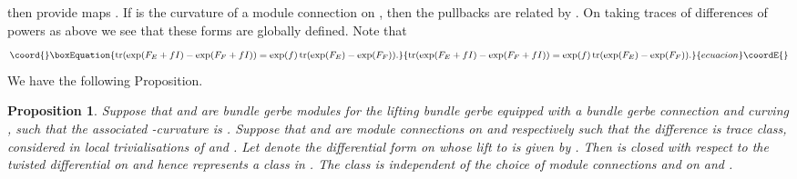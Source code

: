 \documentclass[a4paper,reqno]{amsart}
\DeclareMathOperator{\tr}{tr}
\theoremstyle{plain}
\newtheorem{proposition}[theorem]{Proposition}
\theoremstyle{definition}
\theoremstyle{remark}
\numberwithin{equation}{section}
\numberwithin{figure}{section}
\providecommand{\<}{\langle}
\renewcommand{\>}{\rangle}
\begin{document}
then provide maps \coordHE{}.  If \coordHE{} is the curvature of a module 
connection on \coordHE{}, then the pullbacks \coordHE{} are related by \coordHE{}.  On taking traces 
of differences of powers as above we see that these forms 
are globally defined.    
Note that 
\begin{equation}\coord{}\boxEquation{ 
\label{eq:character form} 
\tr(\exp(F_E + fI) - \exp(F_F + fI)) 
= \exp(f)\tr(\exp(F_E) - \exp(F_F)). 
}{ 
\tr(\exp(F_E + fI) - \exp(F_F + fI)) 
= \exp(f)\tr(\exp(F_E) - \exp(F_F)). 
}{ecuacion}\coordE{}\end{equation} 
We have the following Proposition. 
\begin{proposition} 
Suppose that \coordHE{} and \coordHE{} are \coordHE{} bundle gerbe modules for 
the lifting bundle gerbe \coordHE{} equipped with a 
bundle gerbe connection \coordHE{} and curving \coordHE{}, such 
that the associated \coordHE{}-curvature is \coordHE{}.  
Suppose that \coordHE{} and \coordHE{} are module 
connections on \coordHE{} and \coordHE{} respectively 
such that the difference \coordHE{} is trace class, 
considered in local trivialisations of \coordHE{} and \coordHE{}.    
Let \coordHE{} denote the differential 
form on \coordHE{} whose lift to \coordHE{} is given by \coordHE{}.  Then 
\coordHE{} is closed with respect to the twisted differential 
\coordHE{} on \coordHE{} and hence represents a class 
in \coordHE{}.  The class \coordHE{} is independent 
of the choice of module connections \coordHE{} and 
\coordHE{} on \coordHE{} and \coordHE{}.  
\end{proposition} 
\end{document}
